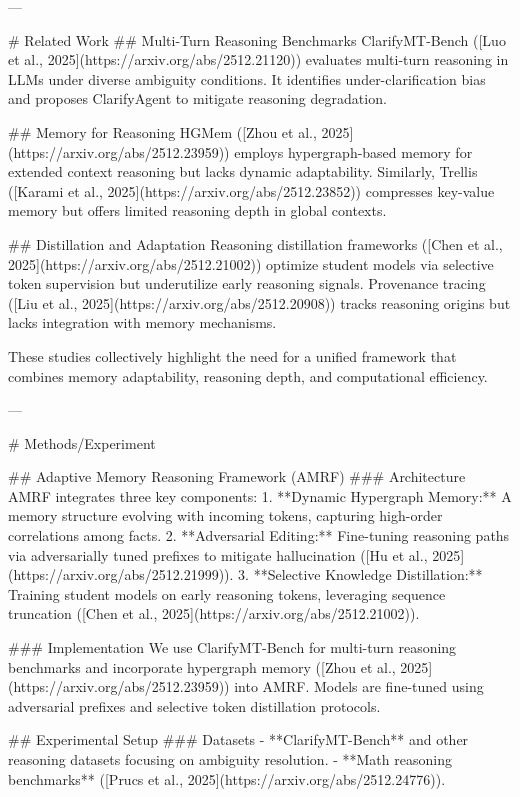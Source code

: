 ---

# Related Work  
## Multi-Turn Reasoning Benchmarks  
ClarifyMT-Bench ([Luo et al., 2025](https://arxiv.org/abs/2512.21120)) evaluates multi-turn reasoning in LLMs under diverse ambiguity conditions. It identifies under-clarification bias and proposes ClarifyAgent to mitigate reasoning degradation.  

## Memory for Reasoning  
HGMem ([Zhou et al., 2025](https://arxiv.org/abs/2512.23959)) employs hypergraph-based memory for extended context reasoning but lacks dynamic adaptability. Similarly, Trellis ([Karami et al., 2025](https://arxiv.org/abs/2512.23852)) compresses key-value memory but offers limited reasoning depth in global contexts.  

## Distillation and Adaptation  
Reasoning distillation frameworks ([Chen et al., 2025](https://arxiv.org/abs/2512.21002)) optimize student models via selective token supervision but underutilize early reasoning signals. Provenance tracing ([Liu et al., 2025](https://arxiv.org/abs/2512.20908)) tracks reasoning origins but lacks integration with memory mechanisms.  

These studies collectively highlight the need for a unified framework that combines memory adaptability, reasoning depth, and computational efficiency.

---

# Methods/Experiment  

## Adaptive Memory Reasoning Framework (AMRF)  
### Architecture  
AMRF integrates three key components:  
1. **Dynamic Hypergraph Memory:** A memory structure evolving with incoming tokens, capturing high-order correlations among facts.  
2. **Adversarial Editing:** Fine-tuning reasoning paths via adversarially tuned prefixes to mitigate hallucination ([Hu et al., 2025](https://arxiv.org/abs/2512.21999)).  
3. **Selective Knowledge Distillation:** Training student models on early reasoning tokens, leveraging sequence truncation ([Chen et al., 2025](https://arxiv.org/abs/2512.21002)).  

### Implementation  
We use ClarifyMT-Bench for multi-turn reasoning benchmarks and incorporate hypergraph memory ([Zhou et al., 2025](https://arxiv.org/abs/2512.23959)) into AMRF. Models are fine-tuned using adversarial prefixes and selective token distillation protocols.  

## Experimental Setup  
### Datasets  
- **ClarifyMT-Bench** and other reasoning datasets focusing on ambiguity resolution.  
- **Math reasoning benchmarks** ([Prucs et al., 2025](https://arxiv.org/abs/2512.24776)).  

